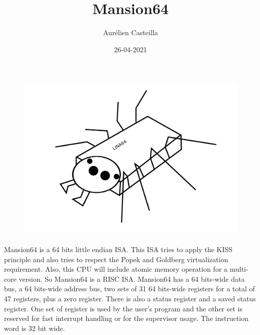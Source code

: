 \documentclass[12pt]{article}
\author{Aurélien Casteilla}
\date{26-04-2021}
\title{Mansion64}
\begin{document}
\maketitle
\begin{figure}[h!]
    \includegraphics[width=\linewidth]{mascotte.png}
\end{figure}
\newpage

\paragraph{}
        Mansion64 is a 64 bits little endian ISA. This ISA tries to apply
        the KISS principle and also tries to respect the Popek and Goldberg
        virtualization requirement. Also, this CPU will include atomic memory
        operation for a multi-core version. So Mansion64 is a RISC ISA.
        Mansion64 has a 64 bits-wide data bus, a 64 bits-wide address bus,
        two sets of 31 64 bits-wide registers for a total of 47 registers, plus
        a zero register.  There is also a status register and a saved status
        register. One set of register is used by the user's program and the
        other set is reserved for fast interrupt handling or for the supervisor
        usage. The instruction word is 32 bit wide.
        \setcounter{secnumdepth}{-1}
\end{document}
